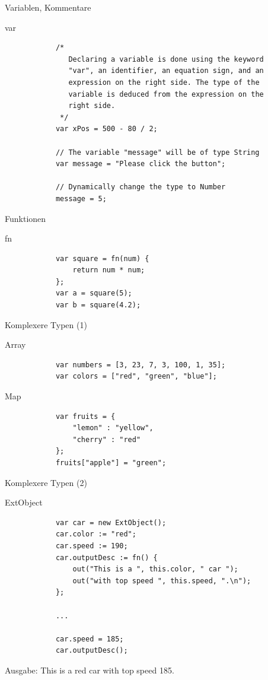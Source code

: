 \documentclass[ucs,9pt]{beamer}
\begin{document}
\begin{frame}[fragile]{Variablen, Kommentare}
	\begin{block}{var}
		\begin{lstlisting}
			/*
			   Declaring a variable is done using the keyword
			   "var", an identifier, an equation sign, and an
			   expression on the right side. The type of the
			   variable is deduced from the expression on the
			   right side.
			 */
			var xPos = 500 - 80 / 2;

			// The variable "message" will be of type String
			var message = "Please click the button";

			// Dynamically change the type to Number
			message = 5;
		\end{lstlisting}
	\end{block}
\end{frame}

\begin{frame}[fragile]{Funktionen}
	\begin{block}{fn}
		\begin{lstlisting}
			var square = fn(num) {
			    return num * num;
			};
			var a = square(5);
			var b = square(4.2);
		\end{lstlisting}
	\end{block}
\end{frame}

\begin{frame}[fragile]{Komplexere Typen (1)}
	\begin{block}{Array}
		\begin{lstlisting}
			var numbers = [3, 23, 7, 3, 100, 1, 35];
			var colors = ["red", "green", "blue"];
		\end{lstlisting}
	\end{block}
	\begin{block}{Map}
		\begin{lstlisting}
			var fruits = {
			    "lemon" : "yellow",
			    "cherry" : "red"
			};
			fruits["apple"] = "green";
		\end{lstlisting}
	\end{block}
\end{frame}

\begin{frame}[fragile]{Komplexere Typen (2)}
	\begin{block}{ExtObject}
		\begin{lstlisting}
			var car = new ExtObject();
			car.color := "red";
			car.speed := 190;
			car.outputDesc := fn() {
			    out("This is a ", this.color, " car ");
			    out("with top speed ", this.speed, ".\n");
			};

			...

			car.speed = 185;
			car.outputDesc();
		\end{lstlisting}
	\end{block}
	Ausgabe: This is a red car with top speed 185.
\end{frame}
\end{document}
